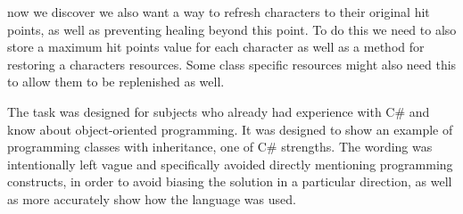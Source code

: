 now we discover we also want a way to refresh characters to their original hit points, as well as preventing healing beyond this point.
To do this we need to also store a maximum hit points value for each character as well as a method for restoring a characters resources.
Some class specific resources might also need this to allow them to be replenished as well.

The task was designed for subjects who already had experience with C\# and know about object-oriented programming.
It was designed to show an example of programming classes with inheritance, one of C\# strengths.
The wording was intentionally left vague and specifically avoided directly mentioning programming constructs, in order to avoid biasing the solution in a particular direction, as well as more accurately show how the language was used.